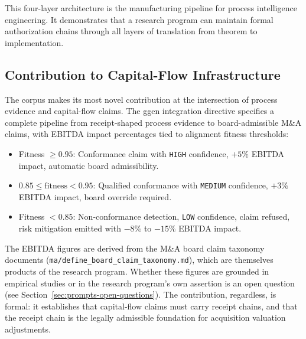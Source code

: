 This four-layer architecture is the manufacturing pipeline for process intelligence
engineering. It demonstrates that a research program can maintain formal authorization
chains through all layers of translation from theorem to implementation.

\subsection{Contribution to Capital-Flow Infrastructure}
\label{sec:prompts-contribution-capital}

The corpus makes its most novel contribution at the intersection of process evidence
and capital-flow claims. The ggen integration directive specifies a complete pipeline
from receipt-shaped process evidence to board-admissible M\&A claims, with EBITDA
impact percentages tied to alignment fitness thresholds:

\begin{itemize}
  \item Fitness $\geq 0.95$: Conformance claim with \texttt{HIGH} confidence,
    $+5\%$ EBITDA impact, automatic board admissibility.
  \item $0.85 \leq \text{fitness} < 0.95$: Qualified conformance with \texttt{MEDIUM}
    confidence, $+3\%$ EBITDA impact, board override required.
  \item Fitness $< 0.85$: Non-conformance detection, \texttt{LOW} confidence, claim
    refused, risk mitigation emitted with $-8\%$ to $-15\%$ EBITDA impact.
\end{itemize}

The EBITDA figures are derived from the M\&A board claim taxonomy documents
(\texttt{ma/define\_board\_claim\_taxonomy.md}), which are themselves products of the
research program. Whether these figures are grounded in empirical studies or in the
research program's own assertion is an open question (see
Section~\ref{sec:prompts-open-questions}). The contribution, regardless, is formal:
it establishes that capital-flow claims must carry receipt chains, and that the
receipt chain is the legally admissible foundation for acquisition valuation
adjustments.
